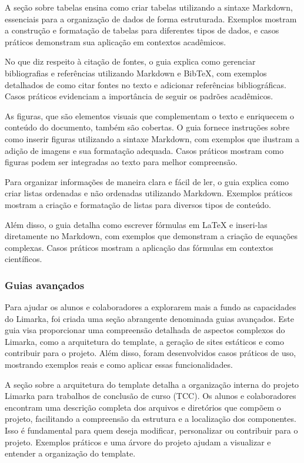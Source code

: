 \documentclass[
	12pt,				%
	oneside,			%
	a4paper,			%
	english,			%
	french,				%
	spanish,			%
	brazil				%
	]{abntex2}
\begin{document}
A seção sobre tabelas ensina como criar tabelas utilizando a sintaxe
Markdown, essenciais para a organização de dados de forma estruturada.
Exemplos mostram a construção e formatação de tabelas para diferentes
tipos de dados, e casos práticos demonstram sua aplicação em contextos
acadêmicos.

No que diz respeito à citação de fontes, o guia explica como gerenciar
bibliografias e referências utilizando Markdown e BibTeX, com exemplos
detalhados de como citar fontes no texto e adicionar referências
bibliográficas. Casos práticos evidenciam a importância de seguir os
padrões acadêmicos.

As figuras, que são elementos visuais que complementam o texto e
enriquecem o conteúdo do documento, também são cobertas. O guia fornece
instruções sobre como inserir figuras utilizando a sintaxe Markdown, com
exemplos que ilustram a adição de imagens e sua formatação adequada.
Casos práticos mostram como figuras podem ser integradas ao texto para
melhor compreensão.

Para organizar informações de maneira clara e fácil de ler, o guia
explica como criar listas ordenadas e não ordenadas utilizando Markdown.
Exemplos práticos mostram a criação e formatação de listas para diversos
tipos de conteúdo.

Além disso, o guia detalha como escrever fórmulas em LaTeX e inseri-las
diretamente no Markdown, com exemplos que demonstram a criação de
equações complexas. Casos práticos mostram a aplicação das fórmulas em
contextos científicos.

\hypertarget{guias-avanuxe7ados}{%
\subsubsection{Guias avançados}\label{guias-avanuxe7ados}}

Para ajudar os alunos e colaboradores a explorarem mais a fundo as
capacidades do Limarka, foi criada uma seção abrangente denominada guias
avançados. Este guia visa proporcionar uma compreensão detalhada de
aspectos complexos do Limarka, como a arquitetura do template, a geração
de sites estáticos e como contribuir para o projeto. Além disso, foram
desenvolvidos casos práticos de uso, mostrando exemplos reais e como
aplicar essas funcionalidades.

A seção sobre a arquitetura do template detalha a organização interna do
projeto Limarka para trabalhos de conclusão de curso (TCC). Os alunos e
colaboradores encontram uma descrição completa dos arquivos e diretórios
que compõem o projeto, facilitando a compreensão da estrutura e a
localização dos componentes. Isso é fundamental para quem deseja
modificar, personalizar ou contribuir para o projeto. Exemplos práticos
e uma árvore do projeto ajudam a visualizar e entender a organização do
template.
\end{document}
